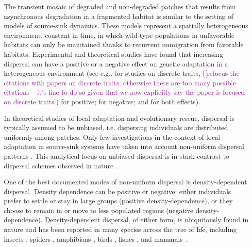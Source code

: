 \documentclass[11pt]{article}
\newcommand{\florence}[1]{\textcolor{purple}{(#1)}} %
\newcommand{\chg}[1]{\textcolor{change}{#1}}
\begin{document}
The transient mosaic of degraded and non-degraded patches that results from asynchronous degradation in a fragmented habitat is similar to the setting of models of source-sink dynamics. These models represent a spatially heterogeneous environment, constant in time, in which wild-type populations in unfavorable habitats can only be maintained thanks to recurrent immigration from favorable habitats. 
Experimental and theoretical studies have found that increasing dispersal can have a positive or a negative effect on genetic adaptation in a heterogeneous environment (see e.g., for studies on discrete traits, \florence{[refocus the citations with papers on discrete traits; otherwise there are too many possible citations -- it's fine to do so given that we now explicitly say the paper is focused on discrete traits]}\citet{holt_1997,gomulkiewicz_1999} for positive; \citet{storfer_1998,garcia_1997,kirkpatrick_1997,fedorka_2012} for negative; and \chg{\citet{kawecki_2000, gallet_2018}} for both effects).

In theoretical studies of local adaptation and evolutionary rescue, dispersal is typically assumed to be unbiased, i.e. dispersing individuals are distributed uniformly among patches. Only few investigations in the context of local adaptation in source-sink systems have taken into account non-uniform dispersal patterns \citep[e.g.][]{kawecki_1995,holt_1996,kawecki_2002,amarasekare_2004}. This analytical focus on unbiased dispersal is in stark contrast to dispersal schemes observed in nature \citep[][]{edelaar_2008,clobert_2009,edelaar_2012}. 

One of the best documented modes of non-uniform dispersal is density-dependent dispersal. Density dependence can be positive or negative: either individuals prefer to settle or stay in large groups (positive density-dependence), or they choose to remain in or move to less populated regions (negative density-dependence). Density-dependent dispersal, of either form, is ubiquitously found in nature and has been reported in many species across the tree of life, including insects \citep{endriss_2019}, spiders \citep{meester2010}, amphibians \citep{gautier_2006}, birds \citep{wilson_2017}, fishes \citep{turgeon_2012}, and mammals~\citep{stoen_2006}.
\end{document}
